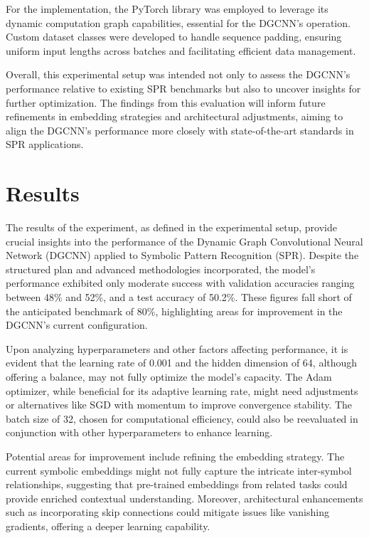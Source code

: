 \documentclass{article}
\begin{document}
For the implementation, the PyTorch library was employed to leverage its dynamic computation graph capabilities, essential for the DGCNN's operation. Custom dataset classes were developed to handle sequence padding, ensuring uniform input lengths across batches and facilitating efficient data management.

Overall, this experimental setup was intended not only to assess the DGCNN's performance relative to existing SPR benchmarks but also to uncover insights for further optimization. The findings from this evaluation will inform future refinements in embedding strategies and architectural adjustments, aiming to align the DGCNN's performance more closely with state-of-the-art standards in SPR applications.

\section{Results}
The results of the experiment, as defined in the experimental setup, provide crucial insights into the performance of the Dynamic Graph Convolutional Neural Network (DGCNN) applied to Symbolic Pattern Recognition (SPR). Despite the structured plan and advanced methodologies incorporated, the model's performance exhibited only moderate success with validation accuracies ranging between 48\% and 52\%, and a test accuracy of 50.2\%. These figures fall short of the anticipated benchmark of 80\%, highlighting areas for improvement in the DGCNN's current configuration.

Upon analyzing hyperparameters and other factors affecting performance, it is evident that the learning rate of 0.001 and the hidden dimension of 64, although offering a balance, may not fully optimize the model's capacity. The Adam optimizer, while beneficial for its adaptive learning rate, might need adjustments or alternatives like SGD with momentum to improve convergence stability. The batch size of 32, chosen for computational efficiency, could also be reevaluated in conjunction with other hyperparameters to enhance learning.

Potential areas for improvement include refining the embedding strategy. The current symbolic embeddings might not fully capture the intricate inter-symbol relationships, suggesting that pre-trained embeddings from related tasks could provide enriched contextual understanding. Moreover, architectural enhancements such as incorporating skip connections could mitigate issues like vanishing gradients, offering a deeper learning capability.
\end{document}
